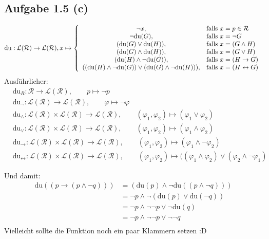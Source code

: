 \documentclass[12pt,a4paper]{article}
\begin{document}
\subsection*{Aufgabe 1.5 (c)}
\begin{align*}
\text{du}:\mathcal{L}(\mathcal{R})\to\mathcal{L}(\mathcal{R}),x\mapsto \left\lbrace\begin{array}{cl}
\neg x, & \text{falls } x=p\in\mathcal{R}\\
\neg\text{du}(G), & \text{falls } x=\neg G\\
(\text{du}(G)\vee\text{du}(H)), & \text{falls } x=(G\wedge H)\\
(\text{du}(G)\wedge\text{du}(H)), & \text{falls } x=(G\vee H)\\
(\text{du}(H)\wedge\neg\text{du}(G)), & \text{falls } x=(H\to G)\\
((\text{du}(H)\wedge\neg \text{du}(G))\vee(\text{du}(G)\wedge\neg\text{du}(H))), & \text{falls } x=(H\leftrightarrow G)\\
\end{array}\right.
\end{align*}
Ausführlicher:
\begin{align*}
&\text{du}_R:\mathcal{R}\to\mathcal{L}(\mathcal{R}),\qquad p\mapsto\neg p\\
&\text{du}_{\neg}:\mathcal{L}(\mathcal{R})\to\mathcal{L}(\mathcal{R}),\qquad\varphi\mapsto\neg\varphi\\
&\text{du}_{\wedge}:\mathcal{L}(\mathcal{R})\times\mathcal{L}(\mathcal{R})\to\mathcal{L}(\mathcal{R}),\qquad(\varphi_1,\varphi_2)\mapsto(\varphi_1\vee\varphi_2)\\
&\text{du}_{\vee}:\mathcal{L}(\mathcal{R})\times\mathcal{L}(\mathcal{R})\to\mathcal{L}(\mathcal{R}),\qquad(\varphi_1,\varphi_2)\mapsto(\varphi_1\wedge\varphi_2)\\
&\text{du}_{\to}:\mathcal{L}(\mathcal{R})\times\mathcal{L}(\mathcal{R})\to\mathcal{L}(\mathcal{R}),\qquad(\varphi_1,\varphi_2)\mapsto(\varphi_1\wedge\neg\varphi_2)\\
&\text{du}_{\leftrightarrow}:\mathcal{L}(\mathcal{R})\times\mathcal{L}(\mathcal{R})\to\mathcal{L}(\mathcal{R}),\qquad(\varphi_1,\varphi_2)\mapsto((\varphi_1\wedge\varphi_2)\vee(\varphi_2\wedge\neg\varphi_1)
\end{align*}

Und damit:
\begin{align*}
\text{du}((p\to(p\wedge\neg q)))
&=(\text{du}(p)\wedge\neg\text{du}((p\wedge\neg q)))\\
&=\neg p\wedge\neg(\text{du}(p)\vee\text{du}(\neg q))\\
&=\neg p\wedge\neg\neg p\vee\neg\text{du}(q)\\
&=\neg p\wedge\neg\neg p\vee\neg\neg q\\
\end{align*}
Vielleicht sollte die Funktion noch ein paar Klammern setzen :D
\end{document}
